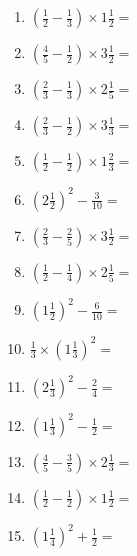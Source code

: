 \documentclass[12pt]{article}
\begin{document}
\begin{enumerate}
\item \large $ \left( \frac{1}{2} - \frac{1}{3} \right) \times 1 \frac{1}{2} = $ \vspace{1.6cm}
\item \large $ \left( \frac{4}{5} - \frac{1}{2} \right) \times 3 \frac{1}{2} = $ \vspace{1.6cm}
\item \large $ \left( \frac{2}{3} - \frac{1}{3} \right) \times 2 \frac{1}{5} = $ \vspace{1.6cm}
\item \large $ \left( \frac{2}{3} - \frac{1}{2} \right) \times 3 \frac{1}{3} = $ \vspace{1.6cm}
\item \large $ \left( \frac{1}{2} - \frac{1}{2} \right) \times 1 \frac{2}{3} = $ \vspace{1.6cm}
\item \large $ \left( 2 \frac{1}{2} \right)^2 - \frac{3}{10} = $ \vspace{1.6cm}
\item \large $ \left( \frac{2}{3} - \frac{2}{5} \right) \times 3 \frac{1}{2} = $ \vspace{1.6cm}
\item \large $ \left( \frac{1}{2} - \frac{1}{4} \right) \times 2 \frac{1}{5} = $ \vspace{1.6cm}
\item \large $ \left( 1 \frac{1}{2} \right)^2 - \frac{6}{10} = $ \vspace{1.6cm}
\item \large $ \frac{1}{3} \times \left( 1 \frac{1}{3} \right)^2 = $ \vspace{1.6cm}
\newpage
\item \large $ \left( 2 \frac{1}{3} \right)^2 - \frac{2}{4} = $ \vspace{1.6cm}
\item \large $ \left( 1 \frac{1}{3} \right)^2 - \frac{1}{2} = $ \vspace{1.6cm}
\item \large $ \left( \frac{4}{5} - \frac{3}{5} \right) \times 2 \frac{1}{3} = $ \vspace{1.6cm}
\item \large $ \left( \frac{1}{2} - \frac{1}{2} \right) \times 1 \frac{1}{2} = $ \vspace{1.6cm}
\item \large $ \left( 1 \frac{1}{4} \right)^2 + \frac{1}{2} = $ \vspace{1.6cm}

\end{enumerate}
\end{document}
